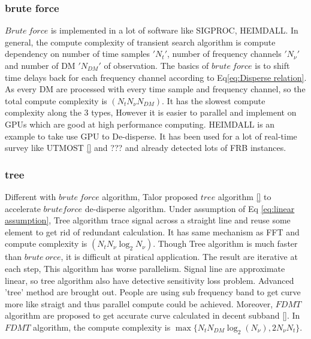 \documentclass[iop]{emulateapj}
\begin{document}
\subsubsection*{brute force}
$Brute~force$ is implemented in a lot of software like SIGPROC, HEIMDALL. In general, the compute complexity of transient search algorithm is compute dependency on number of time samples $'N_t'$, number of frequency channels $'N_{\nu}'$ and number of DM $'N_{DM}'$ of observation. The basics of $brute~force$ is to shift time delays back for each frequency channel according to Eq\ref{eq:Disperse relation}. As every DM are processed with every time sample and frequency channel, so the total compute complexity is $(N_t N_{\nu} N_{DM})$. It has the slowest compute complexity along the 3 types, However it is easier to parallel and implement on GPUs which are good at high performance computing. HEIMDALL is an example to take use GPU to De-disperse. It has been used for a lot of real-time survey like UTMOST \ref{} and ??? and already detected lots of FRB instances. \\

\subsubsection*{tree}
Different with $brute~force$ algorithm, Talor proposed $tree$ algorithm \ref{} to accelerate $brute force$ de-disperse algorithm. Under assumption of Eq \ref{eq:linear assumption}, Tree algorithm trace signal across a straight line and reuse some element to get rid of redundant calculation. It has same mechanism as FFT and compute complexity is $(N_t N_{\nu} \log_2{N_{\nu}})$.	Though Tree algorithm is much faster than $brute~orce$, it is difficult at piratical application. The result are iterative at each step, This algorithm has worse  parallelism. Signal line are approximate linear, so tree algorithm also have detective sensitivity loss problem. Advanced 'tree' method are brought out. People are using sub frequency band to get curve more like straigt and thus parallel compute could be achieved. Moreover, $FDMT$ algorithm are proposed to get accurate curve calculated in decent subband \ref{}. In $FDMT$ algorithm, the compute complexity is $\max \{N_tN_{DM}\log_2(N_{\nu}),2N_{\nu}N_t\}$.\\
\end{document}
